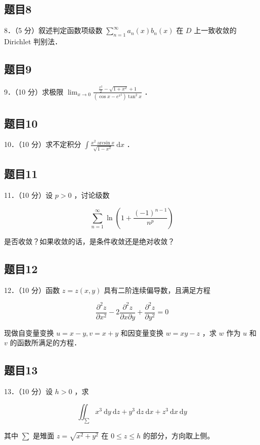 \documentclass{article}
\begin{document}
\subsection{题目8}
8．（5 分）叙述判定函数项级数 \(\sum_{n=1}^{\infty} a_{n}(x) b_{n}(x)\) 在 \(D\) 上一致收敛的 Dirichlet 判别法．

\subsection{题目9}
9．（10 分）求极限 \(\lim _{x \rightarrow 0} \frac{\frac{x^{2}}{2}-\sqrt{1+x^{2}}+1}{\left(\cos x-e^{x^{2}}\right) \tan ^{2} x}\) ．

\subsection{题目10}
10．（10 分）求不定积分 \(\int \frac{x^{2} \arcsin x}{\sqrt{1-x^{2}}} \mathrm{~d} x\) ．

\subsection{题目11}
11．（10 分）设 \(p>0\) ，讨论级数

\[
\sum_{n=1}^{\infty} \ln \left(1+\frac{(-1)^{n-1}}{n^{p}}\right)
\]

是否收敛？如果收敛的话，是条件收敛还是绝对收敛？

\subsection{题目12}
12．（10 分）函数 \(z=z(x, y)\) 具有二阶连续偏导数，且满足方程

\[
\frac{\partial^{2} z}{\partial x^{2}}-2 \frac{\partial^{2} z}{\partial x \partial y}+\frac{\partial^{2} z}{\partial y^{2}}=0
\]

现做自变量变换 \(u=x-y, v=x+y\) 和因变量变换 \(w=x y-z\) ，求 \(w\) 作为 \(u\) 和 \(v\) 的函数所满足的方程．

\subsection{题目13}
13．（10 分）设 \(h>0\) ，求

\[
\iint_{\sum} x^{3} \mathrm{~d} y \mathrm{~d} z+y^{3} \mathrm{~d} z \mathrm{~d} x+z^{3} \mathrm{~d} x \mathrm{~d} y
\]

其中 \(\sum\) 是雉面 \(z=\sqrt{x^{2}+y^{2}}\) 在 \(0 \leq z \leq h\) 的部分，方向取上侧。
\end{document}
